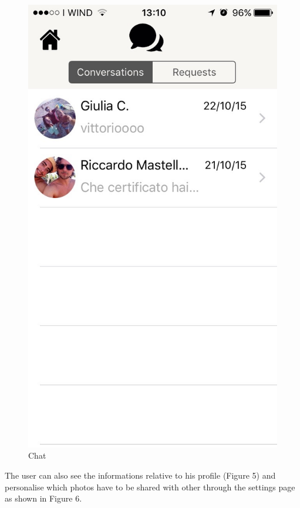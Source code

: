 \begin{multicols}{2}
\begin{figure}[H]
\centering
\includegraphics[scale=0.15]{./images/chat.jpg}
\caption{\label{Chat}Chat}
\end{figure}
\end{multicols}

The user can also see the informations relative to his profile (Figure 5) and personalise which photos have to be shared with other through the settings page as shown in Figure 6.


